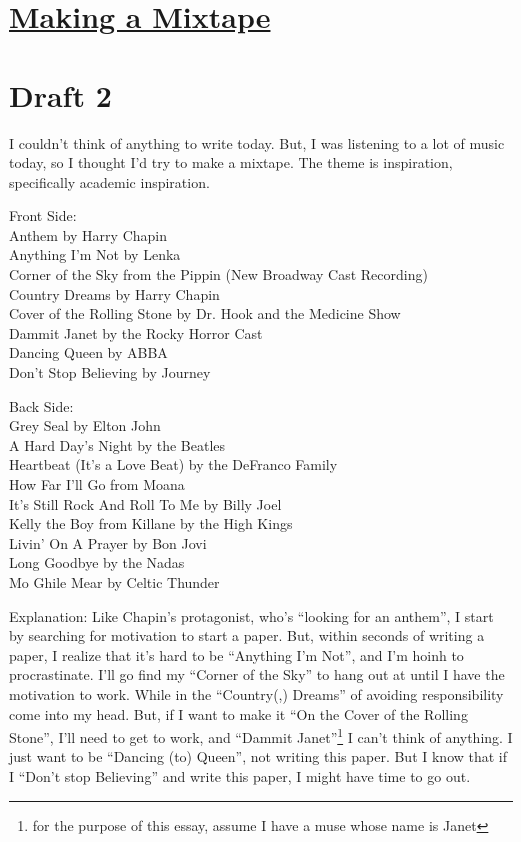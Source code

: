 \documentclass[12pt]{article}[titlepage]
\newcommand{\say}[1]{``#1''}
\newcommand{\1}{\={a}}
\newcommand{\2}{\={e}}
\newcommand{\3}{\={\i}}
\newcommand{\4}{\=o}
\newcommand{\5}{\=u}
\newcommand{\6}{\={A}}
\renewcommand{\,}{\textsuperscript{,}}
\begin{document}
\doublespacing
\section{\href{making-a-mixtape.html}{Making a Mixtape}}
\section{Draft 2}
I couldn't think of anything to write today.
But, I was listening to a lot of music today, so I thought I'd try to make a mixtape.
The theme is inspiration, specifically academic inspiration.

Front Side:\\
Anthem by Harry Chapin\\
Anything I'm Not by Lenka\\
Corner of the Sky from the Pippin (New Broadway Cast Recording)\\
Country Dreams by Harry Chapin\\
Cover of the Rolling Stone by Dr. Hook and the Medicine Show\\
Dammit Janet by the Rocky Horror Cast\\
Dancing Queen by ABBA\\
Don't Stop Believing by Journey

Back Side:\\
Grey Seal by Elton John\\
A Hard Day's Night by the Beatles\\
Heartbeat (It's a Love Beat) by the DeFranco Family\\
How Far I'll Go from Moana\\
It's Still Rock And Roll To Me by Billy Joel\\
Kelly the Boy from Killane by the High Kings\\
Livin' On A Prayer by Bon Jovi\\
Long Goodbye by the Nadas\\
Mo Ghile Mear by Celtic Thunder

Explanation:
Like Chapin's protagonist, who's \say{looking for an anthem}, I start by searching for motivation to start a paper.
But, within seconds of writing a paper, I realize that it's hard to be \say{Anything I'm Not}, and I'm hoinh to procrastinate.
I'll go find my \say{Corner of the Sky} to hang out at until I have the motivation to work.
While in the \say{Country(,) Dreams} of avoiding responsibility come into my head.
But, if I want to make it \say{On the Cover of the Rolling Stone}, I'll need to get to work, and \say{Dammit Janet}\footnote{for the purpose of this essay, assume I have a muse whose name is Janet} I can't think of anything.
I just want to be \say{Dancing (to) Queen}, not writing this paper.
But I know that if I \say{Don't stop Believing} and write this paper, I might have time to go out.
\end{document}
